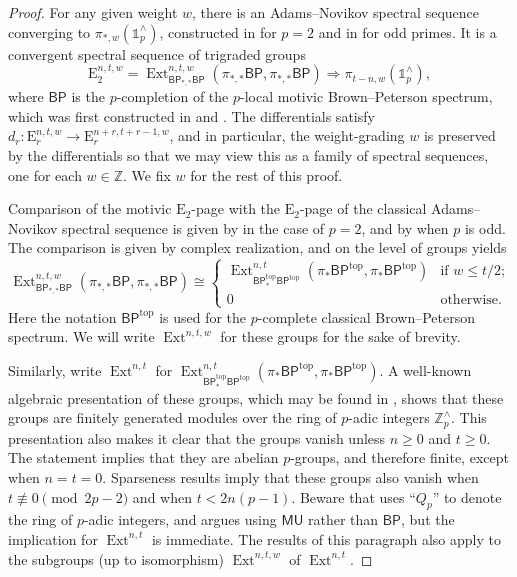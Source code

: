 \documentclass[11pt, oneside, dvipsnames, svgnames, table, final]{amsart}
\newcommand{\mathbx}[1]{\mathbb{#1}}
\theoremstyle{plain}
\theoremstyle{definition}
\theoremstyle{remark}
\newcommand{\Z}{\mathbx{Z}}
\newcommand{\Ext}{\operatorname{Ext}}
\newcommand{\Eoh}{\mathrm{E}}
\newcommand{\isom}{\cong}
\newcommand{\iso}{\isom}
\newcommand{\<}[1]{{\langle}#1 {\rangle}}
\newcommand{\MU}{\mathsf{MU}}
\newcommand{\BP}{\mathsf{BP}}
\newcommand{\BPtop}{\mathsf{BP}^{\mathrm{top}}}
\newcommand{\one}{\mathbb{1}}
\begin{document}
\begin{proof}
  For any given weight $w$, there is an Adams--Novikov spectral sequence converging to $\pi_{*,w}(\one^{\wedge}_p)$, constructed in \cite{Hu2011b} for $p=2$ and in \cite[Thm.~3.1]{Ormsby2014} for odd primes. %
 It is a convergent spectral sequence of trigraded groups
  \[ \Eoh_2^{n,t,w} = \Ext^{n,t,w}_{\BP_{*,*}\BP}(\pi_{*,*}\BP, \pi_{*,*}\BP) \Longrightarrow \pi_{t-n,w}(\one^\wedge_p), \]
  where $\BP$ is the $p$-completion of the $p$-local motivic Brown--Peterson spectrum, which was first constructed in \cite{Vezzosi2001} and \cite{Hu2001b}.
  The differentials satisfy $d_r : \Eoh_r^{n,t,w}\to \Eoh_r^{n+r, t+r-1,w}$, and in particular, the weight-grading $w$ is preserved by the differentials so that we may view this as a family of spectral sequences, one for each $w \in \Z$. We fix $w$ for the rest of this proof. 

  Comparison of the motivic $\Eoh_2$-page with the $\Eoh_2$-page of the classical Adams--Novikov spectral sequence is given by \cite[Equation (36)]{Hu2011b} in the case of $p=2$, and by \cite[Prop.~2.4.4(2)]{Stahn2018} when $p$ is odd. The comparison is given by complex realization, and on the level of groups yields
  \begin{equation}
    \label{eq:1}
    \Ext^{n,t,w}_{\BP_{*,*}\BP}(\pi_{*,*}\BP, \pi_{*,*}\BP) \iso
    \begin{cases}
      \Ext^{n,t}_{\BPtop_*\BPtop}(\pi_*\BPtop, \pi_*\BPtop) &\text{if $w \le t/2$;} \\
      0 & \text{otherwise.}
    \end{cases}
  \end{equation}
  Here the notation $\BPtop$ is used for the $p$-complete classical Brown--Peterson spectrum. We will write $\Ext^{n,t,w}$ for these groups for the sake of brevity.
  
  Similarly, write $\Ext^{n,t}$ for $\Ext^{n,t}_{\BPtop_*\BPtop}(\pi_*\BPtop, \pi_*\BPtop)$. A well-known algebraic presentation of these groups, which may be found in \cite[Prop.~3.16]{Ravenel1978}, shows that these groups are finitely generated modules over the ring of $p$-adic integers $\Z^{\wedge}_p$. This presentation also makes it clear that the groups vanish unless $n \ge 0$ and $t \ge 0$. The statement \cite[Thm.~5.2.1(a)]{Ravenel1986} implies that they are abelian $p$-groups, and therefore finite, except when $n=t=0$. Sparseness results  \cite[Cor.~3.1]{Novikov1967} imply that these groups also vanish when $t \not \equiv 0 \pmod{2p-2}$ and when $t<2n(p-1)$. Beware that \cite{Novikov1967} uses ``$Q_p$'' to denote the ring of $p$-adic integers, and argues using $\MU$ rather than $\BP$, but the implication for $\Ext^{n,t}$ is immediate. The results of this paragraph also apply to the subgroups (up to isomorphism) $\Ext^{n,t,w}$ of $\Ext^{n,t}$.


\end{proof}
\end{document}

